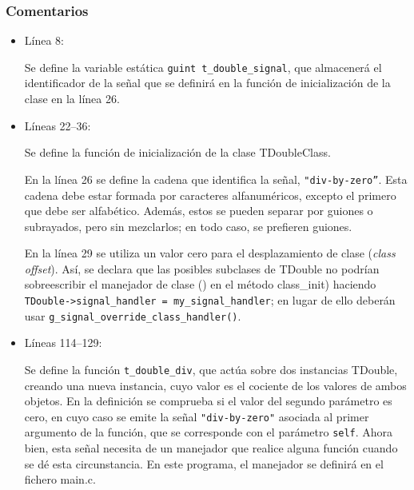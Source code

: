 \subsubsection{Comentarios}
\begin{itemize}
\item Línea 8:\par
  Se define la variable estática \texttt{guint t\_double\_signal}, que almacenerá el identificador de la
  señal que se definirá en la función de inicialización de la clase en la línea 26.
\item Líneas 22--36:\par
  Se define la función de inicialización de la clase \textsf{TDoubleClass}.
  
  En la línea 26 se define la cadena que identifica la señal, \texttt{"div-by-zero''}.
  Esta cadena debe estar formada por caracteres alfanuméricos, excepto el primero que debe ser
  alfabético. Además, estos se pueden separar por guiones o subrayados, pero sin mezclarlos; en
  todo caso, se prefieren guiones.
  
  En la línea 29 se utiliza un valor cero para el desplazamiento de clase (\emph{class offset}).
  Así, se declara que  las posibles subclases de \textsf{TDouble} no podrían sobreescribir
  el manejador de clase () en el método \textsf{class\_init}) haciendo
  \texttt{TDouble->signal\_handler = my\_signal\_handler}; en lugar de ello deberán usar
  \texttt{g\_signal\_override\_class\_handler()}.
\item Líneas 114--129:\par
  Se define la función \texttt{t\_double\_div}, que actúa sobre dos instancias \textsf{TDouble},
  creando una nueva instancia, cuyo valor es el cociente de los valores de ambos objetos.
  En la definición se comprueba si el valor del segundo parámetro es cero, en cuyo caso se
  emite la señal \texttt{"div-by-zero"} asociada al primer argumento de la función, que se
  corresponde con el parámetro \texttt{self}. Ahora bien, esta señal necesita de un manejador que
  realice alguna función cuando se dé esta circunstancia. En este programa, el manejador se
  definirá en el fichero \textsf{main.c}.
\end{itemize}

